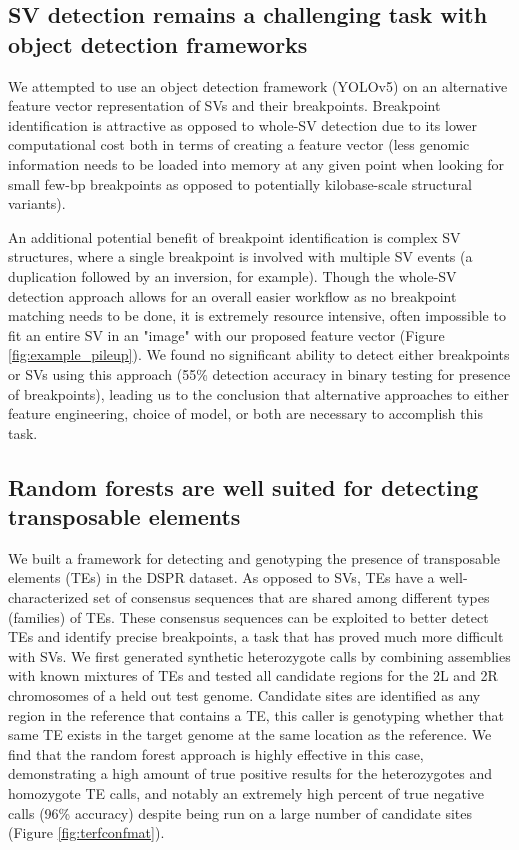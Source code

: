 \subsection{SV detection remains a challenging task with object detection frameworks}

We attempted to use an object detection framework (YOLOv5) on an alternative feature vector representation of SVs and their breakpoints. Breakpoint identification is attractive as opposed to whole-SV detection due to its lower computational cost both in terms of creating a feature vector (less genomic information needs to be loaded into memory at any given point when looking for small few-bp breakpoints as opposed to potentially kilobase-scale structural variants).

An additional potential benefit of breakpoint identification is complex SV structures, where a single breakpoint is involved with multiple SV events (a duplication followed by an inversion, for example). Though the whole-SV detection approach allows for an overall easier workflow as no breakpoint matching needs to be done, it is extremely resource intensive, often impossible to fit an entire SV in an "image" with our proposed feature vector (Figure \ref{fig:example_pileup}). We found no significant ability to detect either breakpoints or SVs using this approach (55\% detection accuracy in binary testing for presence of breakpoints), leading us to the conclusion that alternative approaches to either feature engineering, choice of model, or both are necessary to accomplish this task. 

\subsection{Random forests are well suited for detecting transposable elements}

We built a framework for detecting and genotyping the presence of transposable elements (TEs) in the DSPR dataset. As opposed to SVs, TEs have a well-characterized set of consensus sequences that are shared among different types (families) of TEs. These consensus sequences can be exploited to better detect TEs and identify precise breakpoints, a task that has proved much more difficult with SVs. We first generated synthetic heterozygote calls by combining assemblies with known mixtures of TEs and tested all candidate regions for the 2L and 2R chromosomes of a held out test genome. Candidate sites are identified as any region in the reference that contains a TE, this caller is genotyping whether that same TE exists in the target genome at the same location as the reference. We find that the random forest approach is highly effective in this case, demonstrating a high amount of true positive results for the heterozygotes and homozygote TE calls, and notably an extremely high percent of true negative calls (96\% accuracy) despite being run on a large number of candidate sites (Figure \ref{fig:terfconfmat}).

